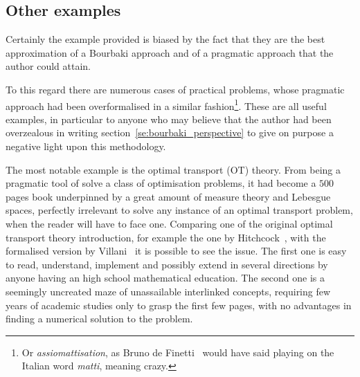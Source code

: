 \documentclass[]{scrartcl}
\theoremstyle{definition}
\begin{document}

\subsection*{Other examples}

Certainly the example provided is biased by the fact that they are the best approximation of a Bourbaki approach and of a pragmatic approach that the author could attain.

To this regard there are numerous cases of practical problems, whose pragmatic approach had been overformalised in a similar fashion\footnote{
    Or \emph{assiomattisation}, as Bruno de Finetti~\cite{de2008bruno} would have said playing on the Italian word \emph{matti}, meaning crazy.
}. These are all useful examples, in particular to anyone who may believe that the author had been overzealous in writing section~\ref{se:bourbaki_perspective} to give on purpose a negative light upon this methodology.

The most notable example is the optimal transport (OT) theory. From being a pragmatic tool of solve a class of optimisation problems, it had become a $500$ pages book underpinned by a great amount of measure theory and Lebesgue spaces, perfectly irrelevant to solve any instance of an optimal transport problem, when the reader will have to face one. Comparing one of the original optimal transport theory introduction, for example the one by Hitchcock~\cite{hitchcock1941distribution}, with the formalised version by Villani~\cite{villani2003topics} it is possible to see the issue. The first one is easy to read, understand, implement and possibly extend in several directions by anyone having an high school mathematical education. The second one is a seemingly uncreated maze of unassailable interlinked concepts, requiring few years of academic studies only to grasp the first few pages, with no advantages in finding a numerical solution to the problem. %
\end{document}
